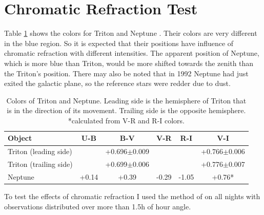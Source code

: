 \documentclass[12pt,a4paper]{report}
\newcommand{\PE}{Perkin-Elmer }
\newcommand{\BC}{Boller \& Chivens }
\begin{document}
\section*{Chromatic Refraction Test}

Table \ref{Tab:colors} shows the colors for Triton \citep{Pascu2006} and Neptune \cite{Schmude2016}. Their colors are very different in the blue region. So it is expected that their positions have influence of chromatic refraction with different intensities. The apparent position of Neptune, which is more blue than Triton, would be more shifted towards the zenith than the Triton's position. There may also be noted that in 1992 Neptune had just exited the galactic plane, so the reference stars were redder due to dust.

\begin{table}[h]
\centering
\begin{tabular}{|l|c|c|c|c|c|}
\hline
Object & U-B & B-V & V-R & R-I & V-I\\
\hline
Triton (leading side) & & +0.696$\pm$0.009 & & & +0.766$\pm$0.006 \\
Triton (trailing side) & & +0.699$\pm$0.006 & & & +0.776$\pm$0.007 \\
Neptune & +0.14 & +0.39 & -0.29 & -1.05 & +0.76*\\
\hline
\end{tabular}
\caption{Colors of Triton and Neptune. Leading side is the hemisphere of Triton that is in the direction of its movement. Trailing side is the opposite hemisphere. *calculated from V-R and R-I colors.}
\label{Tab:colors}
\end{table}

To test the effects of chromatic refraction I used the method of \cite{Benedetti-Rossi2014} on all nights with observations distributed over more than 1.5h of hour angle.%

\end{document}
